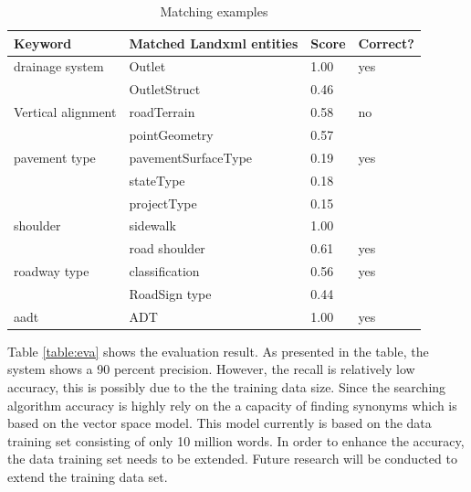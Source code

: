 \documentclass[NewProceedings, InsideFigs]{ascelike} %
\begin{document}
\begin{table} [t] 
\caption{Matching examples}
\label{table:examples}
\centering
\small
\renewcommand{\arraystretch}{1.25}
\begin{tabular}{l l l l}
\hline
\hline
\textbf{Keyword} & \textbf{Matched Landxml entities} & \textbf{Score} & \textbf{Correct?}\\
\hline
drainage system & Outlet & 1.00 & yes\\
 & OutletStruct & 0.46\\
Vertical alignment & roadTerrain & 0.58 & no\\
 & pointGeometry & 0.57\\
pavement type & pavementSurfaceType & 0.19 & yes\\
 & stateType & 0.18\\
 & projectType & 0.15\\
shoulder & sidewalk & 1.00\\
 & road shoulder & 0.61 & yes\\
roadway type & classification & 0.56 & yes\\
 & RoadSign type & 0.44\\
aadt & ADT & 1.00 & yes\\
\hline
\hline
\end{tabular}
\normalsize
\end{table}
%
Table \ref{table:eva} shows the evaluation result. As presented in the table, the system shows a 90 percent precision. However, the recall is relatively low accuracy, this is possibly due to the the training data size. Since the searching algorithm accuracy is highly rely on the a capacity of finding synonyms which is based on the vector space model. This model currently is based on the data training set consisting of only 10 million words. In order to enhance the accuracy, the data training set needs to be extended. Future research will be conducted to extend the training data set. 
%
\end{document}
